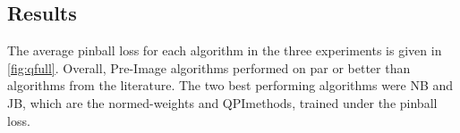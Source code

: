 \documentclass[twoside]{article} \usepackage{aistats2017}
\theoremstyle{definition}
\theoremstyle{theorem}
\newcommand{\qpi}{QPI}
\begin{document}
%	
%		
%		
%
%		
%		
		
%
%
	\subsection{Results}
	\label{sec:experiments:results}
		
%
		
		The average pinball loss for each algorithm in the three experiments is given in \cref{fig:qfull}. Overall, Pre-Image algorithms performed on par or better than algorithms from the literature. The two best performing algorithms were NB and JB, which are the normed-weights and \qpi\space methods, trained under the pinball loss. %
\end{document}
